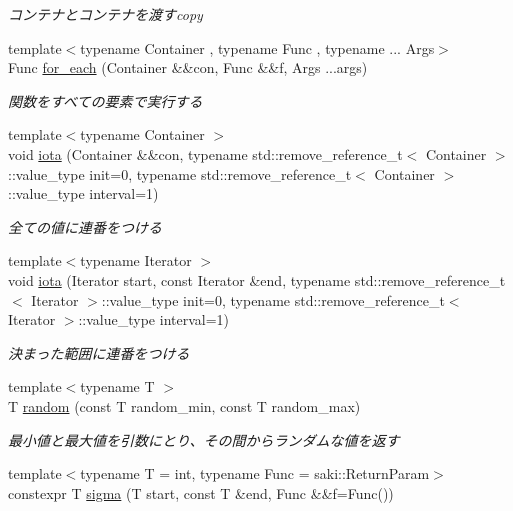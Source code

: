 \begin{DoxyCompactItemize}
\begin{DoxyCompactList}\small\item\em コンテナとコンテナを渡すcopy \end{DoxyCompactList}\item 
{\footnotesize template$<$typename Container , typename Func , typename ... Args$>$ }\\Func \mbox{\hyperlink{namespacesaki_a0b9cd605250f265e3e827406d8f3232d}{for\+\_\+each}} (Container \&\&con, Func \&\&f, Args ...args)
\begin{DoxyCompactList}\small\item\em 関数をすべての要素で実行する \end{DoxyCompactList}\item 
{\footnotesize template$<$typename Container $>$ }\\void \mbox{\hyperlink{namespacesaki_ae2d32321776d936bd523e70b82f9236c}{iota}} (Container \&\&con, typename std\+::remove\+\_\+reference\+\_\+t$<$ Container $>$\+::value\+\_\+type init=0, typename std\+::remove\+\_\+reference\+\_\+t$<$ Container $>$\+::value\+\_\+type interval=1)
\begin{DoxyCompactList}\small\item\em 全ての値に連番をつける \end{DoxyCompactList}\item 
{\footnotesize template$<$typename Iterator $>$ }\\void \mbox{\hyperlink{namespacesaki_a45760a54288991b21995d0b2338ea134}{iota}} (Iterator start, const Iterator \&end, typename std\+::remove\+\_\+reference\+\_\+t$<$ Iterator $>$\+::value\+\_\+type init=0, typename std\+::remove\+\_\+reference\+\_\+t$<$ Iterator $>$\+::value\+\_\+type interval=1)
\begin{DoxyCompactList}\small\item\em 決まった範囲に連番をつける \end{DoxyCompactList}\item 
{\footnotesize template$<$typename T $>$ }\\T \mbox{\hyperlink{namespacesaki_a636caf16f2f00cb734cc867646ac233f}{random}} (const T random\+\_\+min, const T random\+\_\+max)
\begin{DoxyCompactList}\small\item\em 最小値と最大値を引数にとり、その間からランダムな値を返す \end{DoxyCompactList}\item 
{\footnotesize template$<$typename T  = int, typename Func  = saki\+::\+Return\+Param$>$ }\\constexpr T \mbox{\hyperlink{namespacesaki_aa5a82a930469f18d700db4d93b59a7e5}{sigma}} (T start, const T \&end, Func \&\&f=Func())

\end{DoxyCompactItemize}
